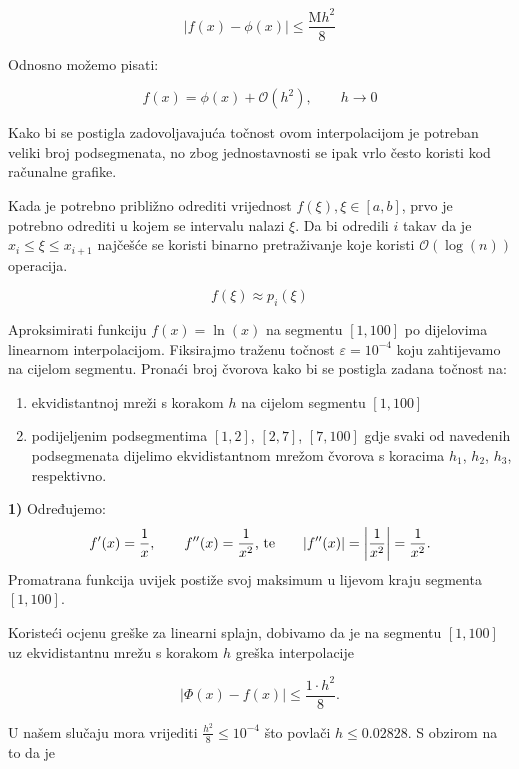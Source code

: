$$
|f(x) - \phi(x)|\leq \frac{\text{M}h^2}{8}
$$

Odnosno možemo pisati:

\begin{equation*}
    f(x) = \phi(x) + \mathcal{O}(h^2),\qquad h\to0
\end{equation*}

Kako bi se postigla zadovoljavajuća točnost ovom interpolacijom je potreban veliki broj podsegmenata, no zbog jednostavnosti se ipak vrlo često koristi kod računalne grafike.

Kada je potrebno približno odrediti vrijednost $f(\xi), \xi\in[a,b]$, prvo je potrebno odrediti u kojem se intervalu nalazi $\xi$. Da bi odredili $i$ takav da je $x_i\leq\xi\leq x_{i+1}$ najčešće se koristi binarno pretraživanje koje koristi $\mathcal{O}(\log(n))$ operacija.

$$
f(\xi)\approx p_i(\xi)
$$

\newpage

\begin{example}
    Aproksimirati funkciju $f(x) = \ln(x)$ na segmentu $[1,100]$ po dijelovima linearnom interpolacijom. Fiksirajmo traženu točnost $\varepsilon = 10^{-4}$ koju zahtijevamo na cijelom segmentu. Pronaći broj čvorova kako bi se postigla zadana točnost na:

    \begin{enumerate}
        \item ekvidistantnoj mreži s korakom $h$ na cijelom segmentu $[1,100]$
        \item podijeljenim podsegmentima $[1,2]$, $[2,7]$, $[7,100]$ gdje svaki od navedenih podsegmenata dijelimo ekvidistantnom mrežom čvorova s koracima $h_1$, $h_2$, $h_3$, respektivno.
    \end{enumerate}
\end{example}

\textbf{1)} Određujemo:
    $$
    f'(x) = {1\over x},\qquad f''(x)={1\over x^2}\text{, te}\qquad |f''(x)|=\left|{1\over x^2}\right|={1\over x^2}.
    $$
    Promatrana funkcija uvijek postiže svoj maksimum u lijevom kraju segmenta $[1,100]$.

Koristeći ocjenu greške za linearni splajn, dobivamo da je na segmentu $[1, 100]$
uz ekvidistantnu mrežu s korakom $h$ greška interpolacije

$$
|\Phi(x)-f(x)|\leq\frac{1\cdot h^2}{8}.
$$

U našem slučaju mora vrijediti $\displaystyle\frac{h^2}{8}\leq 10^{-4}$ što povlači $h\leq0.02828$.
S obzirom na to da je


